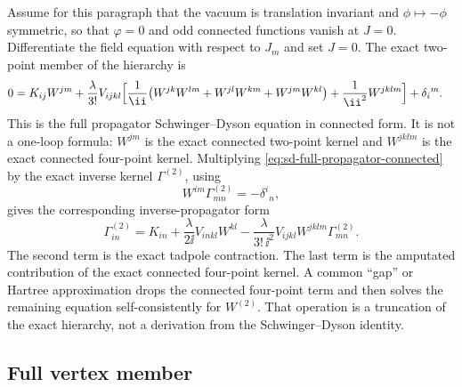Assume for this paragraph that the vacuum is translation invariant and
\(\phi\mapsto-\phi\) symmetric, so that
\(\varphi=0\) and odd connected functions vanish at \(J=0\).  Differentiate
the field equation with respect to \(J_m\) and set \(J=0\).  The exact
two-point member of the hierarchy is
\begin{equation}
\begin{aligned}
  0
  &=
  K_{ij}W^{jm}
  +
  \frac{\lambda}{3!}V_{ijkl}
  \Bigl[
    \frac1{\ii}
      \bigl(
        W^{jk}W^{lm}
        +W^{jl}W^{km}
        +W^{jm}W^{kl}
      \bigr)
    +\frac1{\ii^2}W^{jklm}
  \Bigr]
  +\delta_i{}^m .
\end{aligned}
  \label{eq:sd-full-propagator-connected}
\end{equation}
This is the full propagator Schwinger--Dyson equation in connected form.  It
is not a one-loop formula: \(W^{jm}\) is the exact connected two-point kernel
and \(W^{jklm}\) is the exact connected four-point kernel.  Multiplying
\eqref{eq:sd-full-propagator-connected} by the exact inverse kernel
\(\Gamma^{(2)}\), using
\[
  W^{im}\Gamma^{(2)}_{mn}=-\delta^i{}_n,
\]
gives the corresponding inverse-propagator form
\begin{equation}
  \Gamma^{(2)}_{in}
  =
  K_{in}
  +
  \frac{\lambda}{2\ii}V_{inkl}W^{kl}
  -
  \frac{\lambda}{3!\,\ii^2}
  V_{ijkl}W^{jklm}\Gamma^{(2)}_{mn}.
  \label{eq:sd-full-propagator-inverse}
\end{equation}
The second term is the exact tadpole contraction.  The last term is the
amputated contribution of the exact connected four-point kernel.  A common
``gap'' or Hartree approximation drops the connected four-point term and then
solves the remaining equation self-consistently for \(W^{(2)}\).  That
operation is a truncation of the exact hierarchy, not a derivation from the
Schwinger--Dyson identity.

\subsection*{Full vertex member}

